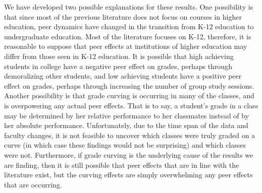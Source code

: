 We have developed two possible explanations for these results. 
One possibility is that since most of the previous literature does not focus on courses in higher education, peer dynamics have changed in the transition from K-12 education to undergraduate education. 
Most of the literature focuses on K-12, therefore, it is reasonable to suppose that peer effects at institutions of higher education may differ from those seen in K-12 education. 
It is possible that high achieving students in college have a negative peer effect on grades, perhaps through demoralizing other students, and low achieving students have a positive peer effect on grades, perhaps through increasing the number of group study sessions. 
Another possibility is that grade curving is occurring in many of the classes, and is overpowering any actual peer effects. 
That is to say, a student's grade in a class may be determined by her relative performance to her classmates instead of by her absolute performance. 
Unfortunately, due to the time span of the data and faculty changes, it is not feasible to uncover which classes were truly graded on a curve (in which case these findings would not be surprising) and which classes were not. 
Furthermore, if grade curving is the underlying cause of the results we are finding, then it is still possible that peer effects that are in line with the literature exist, but the curving effects are simply overwhelming any peer effects that are occurring. 

